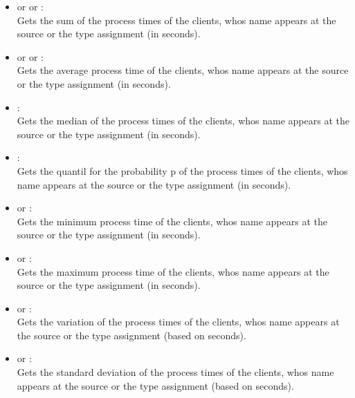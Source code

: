 \begin{itemize}

\item
{} or  or :\\
Gets the sum of the process times of the clients, whos name appears at the source or the type assignment  (in seconds).

\item
{} or  or :\\
Gets the average process time of the clients, whos name appears at the source or the type assignment  (in seconds).

\item
{}:\\
Gets the median of the process times of the clients, whos name appears at the source or the type assignment  (in seconds).

\item
{}:\\
Gets the quantil for the probability p of the process times of the clients, whos name appears at the source or the type assignment  (in seconds).

\item
{} or :\\
Gets the minimum process time of the clients, whos name appears at the source or the type assignment  (in seconds).

\item
{} or :\\
Gets the maximum process time of the clients, whos name appears at the source or the type assignment  (in seconds).

\item
{} or :\\
Gets the variation of the process times of the clients, whos name appears at the source or the type assignment  (based on seconds).

\item
{} or :\\
Gets the standard deviation of the process times of the clients, whos name appears at the source or the type assignment  (based on seconds).


\end{itemize}
